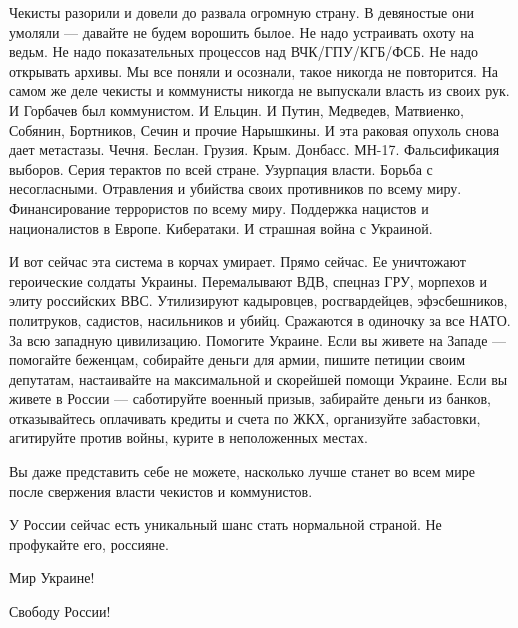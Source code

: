 Чекисты разорили и довели до развала огромную страну. В девяностые они умоляли
— давайте не будем ворошить былое. Не надо устраивать охоту на ведьм. Не надо
показательных процессов над ВЧК/ГПУ/КГБ/ФСБ. Не надо открывать архивы. Мы все
поняли и осознали, такое никогда не повторится. На самом же деле чекисты и
коммунисты никогда не выпускали власть из своих рук. И Горбачев был
коммунистом. И Ельцин. И Путин, Медведев, Матвиенко, Собянин, Бортников, Сечин
и прочие Нарышкины. И эта раковая опухоль снова дает метастазы. Чечня. Беслан.
Грузия. Крым. Донбасс. МН-17. Фальсификация выборов. Серия терактов по всей
стране. Узурпация власти. Борьба с несогласными. Отравления и убийства своих
противников по всему миру. Финансирование террористов по всему миру. Поддержка
нацистов и националистов в Европе. Кибератаки. И страшная война с Украиной.

И вот сейчас эта система в корчах умирает. Прямо сейчас. Ее уничтожают
героические солдаты Украины. Перемалывают ВДВ, спецназ ГРУ, морпехов и элиту
российских ВВС. Утилизируют кадыровцев, росгвардейцев, эфэсбешников,
политруков, садистов, насильников и убийц. Сражаются в одиночку за все НАТО. За
всю западную цивилизацию. Помогите Украине. Если вы живете на Западе —
помогайте беженцам, собирайте деньги для армии, пишите петиции своим депутатам,
настаивайте на максимальной и скорейшей помощи Украине. Если вы живете в России
— саботируйте военный призыв, забирайте деньги из банков, отказывайтесь
оплачивать кредиты и счета по ЖКХ, организуйте забастовки, агитируйте против
войны, курите в неположенных местах.

Вы даже представить себе не можете, насколько лучше станет во всем мире после свержения власти чекистов и коммунистов.

У России сейчас есть уникальный шанс стать нормальной страной. Не профукайте его, россияне.

Мир Украине!

Свободу России!
